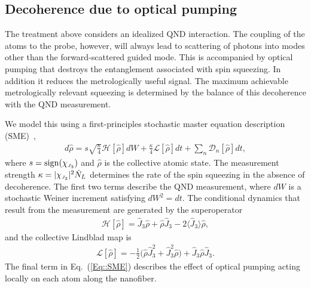 \documentclass[preprint, aps,pra,onecolumn]{revtex4-1} %
\newcommand{\erf}[1]{Eq.~(\ref{#1})}
\newcommand{\expt}[1]{\langle{#1}\rangle}
\newcommand{\smallfrac}[2]{\mbox{$\frac{#1}{#2}$}}
\newcommand{\jz}{\hat{J}_3}
\newcommand{\chieff}{\chi_{\raisebox{-.1pt}{\tiny $J_3$}}}
\begin{document}
	\subsection{Decoherence due to optical pumping}\label{sec:decoherence}
	
The treatment above considers an idealized QND interaction. 
The coupling of the atoms to the probe, however, will always lead to scattering of photons into modes other than the forward-scattered guided mode.  
This is accompanied by optical pumping that destroys the entanglement associated with spin squeezing.  In addition it reduces the metrologically useful signal.  
The maximum achievable metrologically relevant squeezing is determined by the balance of this decoherence with the QND measurement. 

We model this using a first-principles stochastic master equation description (SME)~\cite{jacobs_straightforward_2006, baragiola_three-dimensional_2014},
	\begin{align} \label{Eq::SME}
		d \hat{\rho} = s\sqrt{\frac{\kappa}{4}} \mathcal{H}[\hat{\rho}] dW + \frac{\kappa}{4} \mathcal{L}[\hat{\rho}] dt + \sum_n \mathcal{D}_n [\hat{\rho}] dt,
	\end{align}
where $s = {\rm sign}(\chieff)$ and $\hat{\rho}$ is the collective atomic state. 
The measurement strength $\kappa =|\chieff|^2 \dot{N}_L$ determines the rate of the spin squeezing in the absence of decoherence.  
The first two terms describe the QND measurement, where $dW$ is a stochastic Weiner increment satisfying $dW^2 = dt$. 
The conditional dynamics that result from the measurement are generated by the superoperator
	\begin{align}
		\mathcal{H}[\hat{\rho}] = \jz \hat{\rho} + \hat{\rho} \jz - 2 \expt{\jz} \hat{\rho},
	\end{align}
and the collective Lindblad map is
	\begin{align}
		\mathcal{L}[\hat{\rho}] = - \smallfrac{1}{2} \big( \hat{\rho}  \jz^2 + \jz^2 \hat{\rho} \big) + \jz \hat{\rho} \jz.
	\end{align}
The final term in \erf{Eq::SME} describes the effect of optical pumping acting locally on each atom along the nanofiber. 
\end{document}
